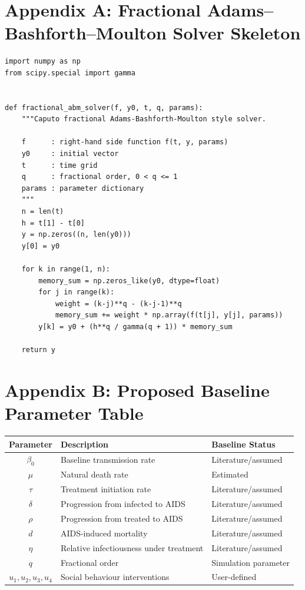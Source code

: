 \documentclass[12pt,a4paper,oneside]{report}
\begin{document}
\appendix
\chapter{Appendix A: Fractional Adams--Bashforth--Moulton Solver Skeleton}
\begin{lstlisting}[style=pythonstyle]
import numpy as np
from scipy.special import gamma


def fractional_abm_solver(f, y0, t, q, params):
    """Caputo fractional Adams-Bashforth-Moulton style solver.

    f      : right-hand side function f(t, y, params)
    y0     : initial vector
    t      : time grid
    q      : fractional order, 0 < q <= 1
    params : parameter dictionary
    """
    n = len(t)
    h = t[1] - t[0]
    y = np.zeros((n, len(y0)))
    y[0] = y0

    for k in range(1, n):
        memory_sum = np.zeros_like(y0, dtype=float)
        for j in range(k):
            weight = (k-j)**q - (k-j-1)**q
            memory_sum += weight * np.array(f(t[j], y[j], params))
        y[k] = y0 + (h**q / gamma(q + 1)) * memory_sum

    return y
\end{lstlisting}

\chapter{Appendix B: Proposed Baseline Parameter Table}
\begin{center}
\renewcommand{\arraystretch}{1.35}
\begin{tabular}{>{\bfseries}c p{6.5cm}p{3cm}}
\toprule
Parameter & Description & Baseline Status\\
\midrule
$\beta_0$ & Baseline transmission rate & Literature/assumed\\
$\mu$ & Natural death rate & Estimated\\
$\tau$ & Treatment initiation rate & Literature/assumed\\
$\delta$ & Progression from infected to AIDS & Literature/assumed\\
$\rho$ & Progression from treated to AIDS & Literature/assumed\\
$d$ & AIDS-induced mortality & Literature/assumed\\
$\eta$ & Relative infectiousness under treatment & Literature/assumed\\
$q$ & Fractional order & Simulation parameter\\
$u_1,u_2,u_3,u_4$ & Social behaviour interventions & User-defined\\
\bottomrule
\end{tabular}
\end{center}
\end{document}

